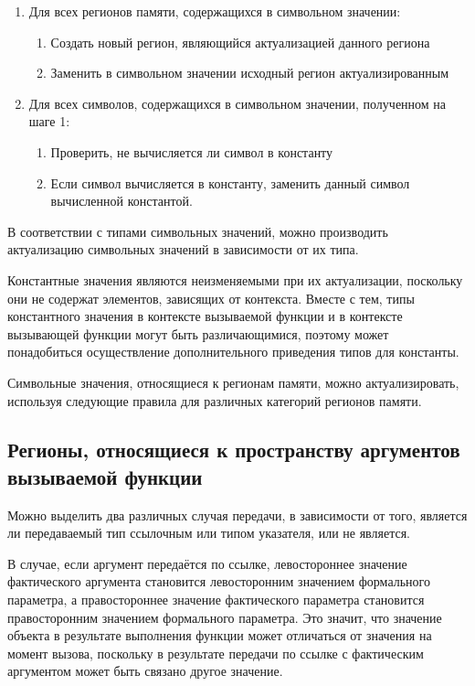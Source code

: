 \begin{enumerate}
 \item Для всех регионов памяти, содержащихся в символьном значении:
 \begin{enumerate}
  \item Создать новый регион, являющийся актуализацией данного региона
  \item Заменить в символьном значении исходный регион актуализированным
 \end{enumerate}
 \item Для всех символов, содержащихся в символьном значении, полученном на шаге 1:
  \begin{enumerate}
  \item Проверить, не вычисляется ли символ в константу
  \item Если символ вычисляется в константу, заменить данный символ вычисленной константой.
 \end{enumerate}

\end{enumerate}

В соответствии с типами символьных значений, можно производить актуализацию символьных значений в зависимости от их типа.

Константные значения являются неизменяемыми при их актуализации, поскольку они не содержат элементов, зависящих от контекста. Вместе с тем, типы константного значения в контексте вызываемой функции и в контексте вызывающей функции могут быть различающимися, поэтому может понадобиться осуществление дополнительного приведения типов для константы.

Символьные значения, относящиеся к регионам памяти, можно актуализировать, используя следующие правила для различных категорий регионов памяти.

\subsection{Регионы, относящиеся к пространству аргументов вызываемой функции}
 
Можно выделить два различных случая передачи, в зависимости от того, является ли передаваемый тип ссылочным или типом указателя, или не является.
 
В случае, если аргумент передаётся по ссылке, левостороннее значение фактического аргумента становится левосторонним значением формального параметра, а правостороннее значение фактического параметра становится правосторонним значением формального параметра. Это значит, что значение объекта в результате выполнения функции может отличаться от значения на момент вызова, поскольку в результате передачи по ссылке с фактическим аргументом может быть связано другое значение.

